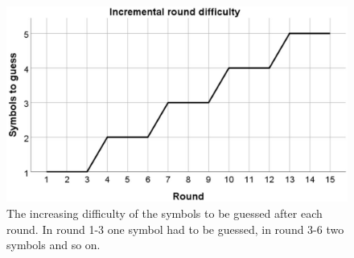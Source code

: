 \documentclass[sigchi]{acmart}
\begin{document}
\begin{figure}[H]
		\begin{footnotesize}
		\centering
			\includegraphics[width=0.9\linewidth]{Abbildungen/RoundDifficulty.JPG}	
			\caption[The difficulty of the rounds]{The increasing difficulty of the symbols to be guessed after each round. In round 1-3 one symbol had to be guessed, in round 3-6 two symbols and so on.}
			\label{RoundDifficulty}
		\end{footnotesize}
	\end{figure}

%
%
\end{document}
